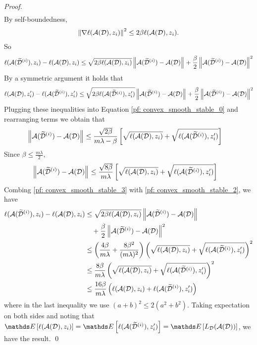 \documentclass[11pt]{article}
\begin{document}
\begin{itemize}
\begin{proof}
\begin{align*}
\end{align*} By self-boundedness, 
\begin{align*}
 \left\|\nabla  \ell({\mathcal A}({\mathcal D}), z_i)\right\|_{}^2 \le 2\beta \ell({\mathcal A}({\mathcal D}), z_i).
\end{align*} So
\begin{align}
\ell({\mathcal A}(\widetilde{{\mathcal D}}^{(i)}), z_i) - \ell({\mathcal A}({\mathcal D}), z_i) \le \sqrt{2\beta \ell({\mathcal A}({\mathcal D}), z_i)}\left\|{\mathcal A}(\widetilde{{\mathcal D}}^{(i)}) - {\mathcal A}({\mathcal D})\right\|_{} +  \frac{\beta}{2} \left\|{\mathcal A}(\widetilde{{\mathcal D}}^{(i)}) - {\mathcal A}({\mathcal D})\right\|_{}^2  \label{pf: convex_smooth_stable_2}
\end{align} By a symmetric argument it holds that
\begin{align*}
\ell({\mathcal A}({\mathcal D}), z_i') - \ell({\mathcal A}(\widetilde{{\mathcal D}}^{(i)}), z_i') \le \sqrt{2\beta \ell({\mathcal A}(\widetilde{{\mathcal D}}^{(i)}), z_i')}\left\|{\mathcal A}(\widetilde{{\mathcal D}}^{(i)}) - {\mathcal A}({\mathcal D})\right\|_{} +  \frac{\beta}{2} \left\|{\mathcal A}(\widetilde{{\mathcal D}}^{(i)}) - {\mathcal A}({\mathcal D})\right\|_{}^2 
\end{align*} Plugging these inequalities into Equation \eqref{pf: convex_smooth_stable_0} and rearranging terms we obtain
that
\begin{align*}
 \left\|{\mathcal A}(\widetilde{{\mathcal D}}^{(i)}) - {\mathcal A}({\mathcal D})\right\|_{} &\le \frac{\sqrt{2\beta}}{m \lambda - \beta }\left[\sqrt{ \ell({\mathcal A}({\mathcal D}), z_i)} + \sqrt{\ell({\mathcal A}(\widetilde{{\mathcal D}}^{(i)}), z_i')}\right]
\end{align*} Since $\beta \le \frac{m \lambda}{2}$,
\begin{align}
 \left\|{\mathcal A}(\widetilde{{\mathcal D}}^{(i)}) - {\mathcal A}({\mathcal D})\right\|_{} &\le \frac{\sqrt{8\beta}}{m \lambda}\left[\sqrt{ \ell({\mathcal A}({\mathcal D}), z_i)} + \sqrt{\ell({\mathcal A}(\widetilde{{\mathcal D}}^{(i)}), z_i')}\right] \label{pf: convex_smooth_stable_3}
\end{align} Combing \eqref{pf: convex_smooth_stable_3} with \eqref{pf: convex_smooth_stable_2}, we have
\begin{align*}
\ell({\mathcal A}(\widetilde{{\mathcal D}}^{(i)}), z_i) - \ell({\mathcal A}({\mathcal D}), z_i) &\le \sqrt{2\beta \ell({\mathcal A}({\mathcal D}), z_i)}\left\|{\mathcal A}(\widetilde{{\mathcal D}}^{(i)}) - {\mathcal A}({\mathcal D})\right\|_{} \\
&\quad +  \frac{\beta}{2} \left\|{\mathcal A}(\widetilde{{\mathcal D}}^{(i)}) - {\mathcal A}({\mathcal D})\right\|_{}^2 \\
&\le \left(\frac{4 \beta}{m \lambda} + \frac{8\beta^2}{(m \lambda)^2}\right) \left(\sqrt{ \ell({\mathcal A}({\mathcal D}), z_i)} + \sqrt{\ell({\mathcal A}(\widetilde{{\mathcal D}}^{(i)}), z_i')}\right)^2\\
&\le  \frac{8 \beta}{m \lambda} \left(\sqrt{ \ell({\mathcal A}({\mathcal D}), z_i)} + \sqrt{\ell({\mathcal A}(\widetilde{{\mathcal D}}^{(i)}), z_i')}\right)^2 \\
&\le \frac{16 \beta}{m \lambda} \left( \ell({\mathcal A}({\mathcal D}), z_i) + \ell({\mathcal A}(\widetilde{{\mathcal D}}^{(i)}), z_i')\right)
\end{align*} where in the last inequality we use $(a+b)^2 \le 2(a^2 + b^2)$. Taking expectation on both sides and noting that $\E{}{\ell(\cA(\cD), z_i)} = \E{}{\ell(\cA(\widetilde{\cD}^{(i)}), z_i')} = \E{}{L_{\cD}(\cA(\cD))}$, we have the result. \qed
\end{proof}
\end{itemize}
\end{document}
